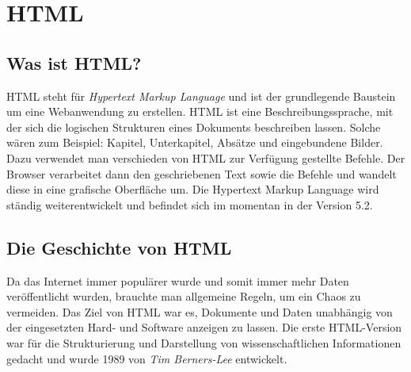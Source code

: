 \section{HTML}
\label{html}

\subsection{Was ist HTML?}
HTML steht für \textit{Hypertext Markup Language} und ist der grundlegende Baustein um eine Webanwendung zu erstellen.
HTML ist eine Beschreibungssprache, mit der sich die logischen Strukturen eines Dokuments beschreiben lassen.
Solche wären zum Beispiel: Kapitel, Unterkapitel, Absätze und eingebundene Bilder. Dazu verwendet man verschieden von HTML zur Verfügung gestellte
Befehle. Der Browser verarbeitet dann den geschriebenen Text sowie die Befehle und wandelt diese in eine grafische Oberfläche um.
Die Hypertext Markup Language wird ständig weiterentwickelt und befindet sich im momentan in der Version 5.2.

\subsection{Die Geschichte von HTML}
Da das Internet immer populärer wurde und somit immer mehr Daten veröffentlicht wurden, brauchte man allgemeine Regeln,
um ein Chaos zu vermeiden. Das Ziel von HTML war es, Dokumente und Daten unabhängig von der eingesetzten Hard- und Software anzeigen zu lassen.
Die erste HTML-Version war für die Strukturierung und Darstellung von wissenschaftlichen Informationen gedacht und wurde 1989 von \textit{Tim Berners-Lee}
entwickelt.

\cite{geschichteHTML}
